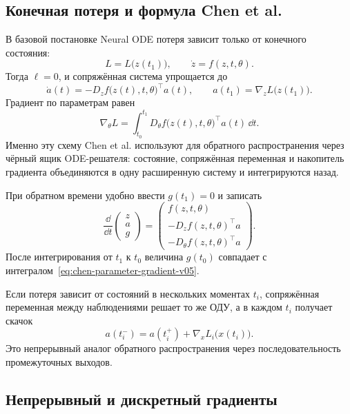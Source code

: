 \subsection{Конечная потеря и формула Chen et al.}

В базовой постановке Neural ODE потеря зависит только от конечного состояния:
\[
L=L\bigl(z(t_1)\bigr),
\qquad
\dot z=f(z,t,\theta).
\]
Тогда $\ell=0$, и сопряжённая система упрощается до
\begin{equation}
\label{eq:chen-adjoint-v05}
\dot a(t)
=-D_zf\bigl(z(t),t,\theta\bigr)^\top a(t),
\qquad
 a(t_1)=\nabla_zL\bigl(z(t_1)\bigr).
\end{equation}
Градиент по параметрам равен
\begin{equation}
\label{eq:chen-parameter-gradient-v05}
\nabla_\theta L
=
\int_{t_0}^{t_1}
D_\theta f\bigl(z(t),t,\theta\bigr)^\top a(t)\,\dd t.
\end{equation}
Именно эту схему Chen et al. используют для обратного распространения через чёрный ящик ODE-решателя: состояние, сопряжённая переменная и накопитель градиента объединяются в одну расширенную систему и интегрируются назад.

При обратном времени удобно ввести $g(t_1)=0$ и записать
\begin{equation}
\label{eq:augmented-adjoint-system-v05}
\frac{\dd}{\dd t}
\begin{pmatrix}
z\\a\\g
\end{pmatrix}
=
\begin{pmatrix}
f(z,t,\theta)\\
-D_zf(z,t,\theta)^\top a\\
-D_\theta f(z,t,\theta)^\top a
\end{pmatrix}.
\end{equation}
После интегрирования от $t_1$ к $t_0$ величина $g(t_0)$ совпадает с интегралом~\eqref{eq:chen-parameter-gradient-v05}.

Если потеря зависит от состояний в нескольких моментах $t_i$, сопряжённая переменная между наблюдениями решает то же ОДУ, а в каждом $t_i$ получает скачок
\begin{equation}
\label{eq:adjoint-jump-v05}
 a(t_i^-)
=
 a(t_i^+)
+
\nabla_x L_i\bigl(x(t_i)\bigr).
\end{equation}
Это непрерывный аналог обратного распространения через последовательность промежуточных выходов.

\subsection{Непрерывный и дискретный градиенты}

